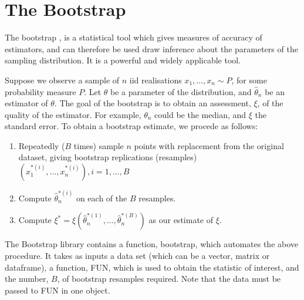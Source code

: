 \documentclass{article}\usepackage[]{graphicx}\usepackage[]{color}
\begin{document}
\section{The Bootstrap}
The bootstrap \parencite{Efron1979}, is a statistical tool which gives measures of accuracy of estimators, and can therefore be used draw inference about the parameters of the sampling distribution. It is a powerful and widely applicable tool.

Suppose we observe a sample of $n$ iid realisations  $x_1,\ldots, x_n \sim P$, for some probability measure $P$. Let $\theta$ be a parameter of the distribution, and $\hat\theta_n$ be an estimator of $\theta$. The goal of the bootstrap is to obtain an assessment, $\xi$, of the quality of the estimator. For example, $\theta_n$ could be the median, and $\xi$ the standard error. To obtain a bootstrap estimate, we procede as follows:

\begin{enumerate}
\item Repeatedly ($B$ times) sample $n$ points with replacement from the original
dataset, giving bootstrap replications (resamples) $(x_1^{*(i)},\ldots,x_n^{*(i)}), i=1,\ldots,B$
\item Compute $\hat\theta_n^{*(i)}$ on each of the $B$ resamples.
\item Compute $\xi^*=\xi(\hat\theta_n^{*(1)},\ldots,\hat\theta_n^{*(B)})$ as our estimate of $\xi$.
\end{enumerate}

The Bootstrap library contains a function, bootstrap, which automates the above procedure. It takes as inputs a data set (which can be a vector, matrix or dataframe), a function, FUN, which is used to obtain the statistic of interest, and the number, $B$, of bootstrap resamples required. Note that the data must be passed to FUN in one object.
\end{document}
